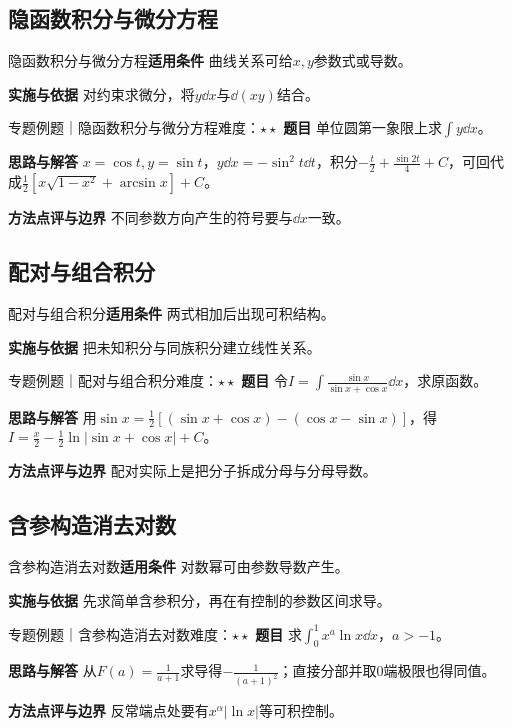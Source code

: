 \subsection{隐函数积分与微分方程}\label{mat:integrals_methods:i25}
\begin{method}{隐函数积分与微分方程}\textbf{适用条件} 曲线关系可给$x,y$参数式或导数。\par\textbf{实施与依据} 对约束求微分，将$y\dd x$与$\dd(xy)$结合。\end{method}
\begin{example}{专题例题｜隐函数积分与微分方程}{难度：$\star\star$}
\textbf{题目} 单位圆第一象限上求$\int y\dd x$。\par\textbf{思路与解答} $x=\cos t,y=\sin t$，$y\dd x=-\sin^2t\dd t$，积分$-\frac{t}{2}+\frac{\sin2t}{4}+C$，可回代成$\frac12[x\sqrt{1-x^2}+\arcsin x]+C$。\par\textbf{方法点评与边界} 不同参数方向产生的符号要与$\dd x$一致。
\end{example}
\subsection{配对与组合积分}\label{mat:integrals_methods:i26}
\begin{method}{配对与组合积分}\textbf{适用条件} 两式相加后出现可积结构。\par\textbf{实施与依据} 把未知积分与同族积分建立线性关系。\end{method}
\begin{example}{专题例题｜配对与组合积分}{难度：$\star\star$}
\textbf{题目} 令$I=\int\frac{\sin x}{\sin x+\cos x}\dd x$，求原函数。\par\textbf{思路与解答} 用$\sin x=\frac12[(\sin x+\cos x)-(\cos x-\sin x)]$，得$I=\frac{x}{2}-\frac12\ln|\sin x+\cos x|+C$。\par\textbf{方法点评与边界} 配对实际上是把分子拆成分母与分母导数。
\end{example}
\subsection{含参构造消去对数}\label{mat:integrals_methods:i27}
\begin{method}{含参构造消去对数}\textbf{适用条件} 对数幂可由参数导数产生。\par\textbf{实施与依据} 先求简单含参积分，再在有控制的参数区间求导。\end{method}
\begin{example}{专题例题｜含参构造消去对数}{难度：$\star\star$}
\textbf{题目} 求$\int_0^1x^a\ln x\dd x$，$a>-1$。\par\textbf{思路与解答} 从$F(a)=\frac{1}{a+1}$求导得$-\frac{1}{(a+1)^2}$；直接分部并取0端极限也得同值。\par\textbf{方法点评与边界} 反常端点处要有$x^\alpha|\ln x|$等可积控制。
\end{example}
